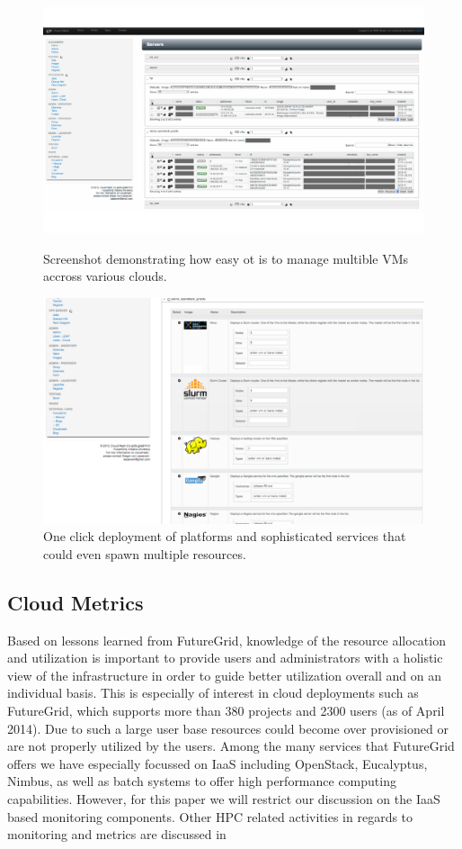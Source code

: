 \documentclass{tex/sig-alternate-2013}
\newcommand{\todo}[1]{{\color{red}{#1}}}
\begin{document}
{\begin{figure}[htb]
  \centering
    \includegraphics[width=1.0\columnwidth]{images/instances.pdf}
  \caption{Screenshot demonstrating how easy ot is to manage multible VMs accross various clouds.}\label{F:instances}
  \centering
    \includegraphics[width=1.0\columnwidth]{images/oneclick.pdf}
  \caption{One click deployment of platforms and sophisticated
    services that could even spawn multiple resources.}\label{F:oneclick}
\end{figure}

\subsection{Cloud Metrics}

\todo{READ}

Based on lessons learned from FutureGrid, knowledge of the resource allocation and utilization is important to provide users and administrators with a holistic view of the infrastructure in order to guide better utilization overall and on an individual basis. This is especially of interest in cloud deployments such as FutureGrid, which supports more than 380 projects and 2300 users (as of April 2014). Due to such a large user base resources could become over provisioned or are not properly utilized by the users. Among the many services that FutureGrid offers we have especially focussed on IaaS including OpenStack, Eucalyptus, Nimbus, as well as batch systems to offer high performance computing capabilities.  However, for this paper we will restrict our discussion on the IaaS based monitoring components.  Other HPC related activities in regards to monitoring and metrics are discussed in \cite{ubmod,las12xdmod-kernel,las12xdmod-planing,las13xdmod,smith13info}

}
\end{document}
